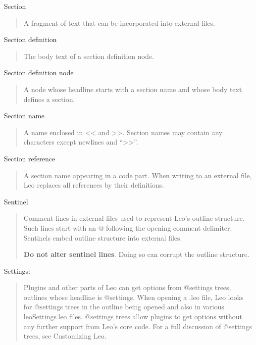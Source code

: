 \documentclass[a4paper,10pt,english]{sphinxmanual}
\begin{document}
Section
\begin{quote}

A fragment of text that can be incorporated into external files.
\end{quote}

Section definition
\begin{quote}

The body text of a section definition node.
\end{quote}

Section definition node
\begin{quote}

A node whose headline starts with a section name and whose body text defines
a section.
\end{quote}

Section name
\begin{quote}

A name enclosed in \textless{}\textless{} and \textgreater{}\textgreater{}. Section names may contain any characters
except newlines and ``\textgreater{}\textgreater{}''.
\end{quote}

Section reference
\begin{quote}

A section name appearing in a code part. When writing to an external file,
Leo replaces all references by their definitions.
\end{quote}

Sentinel
\begin{quote}

Comment lines in external files used to represent Leo's outline structure.
Such lines start with an @ following the opening comment delimiter.
Sentinels embed outline structure into external files.

\textbf{Do not alter sentinel lines}. Doing so can corrupt the outline structure.
\end{quote}

Settings:
\begin{quote}

Plugins and other parts of Leo can get options from @settings trees,
outlines whose headline is @settings. When opening a .leo file, Leo looks
for @settings trees in the outline being opened and also in various
leoSettings.leo files. @settings trees allow plugins to get options without
any further support from Leo's core code. For a full discussion of @settings
trees, see Customizing Leo.
\end{quote}
\end{document}
